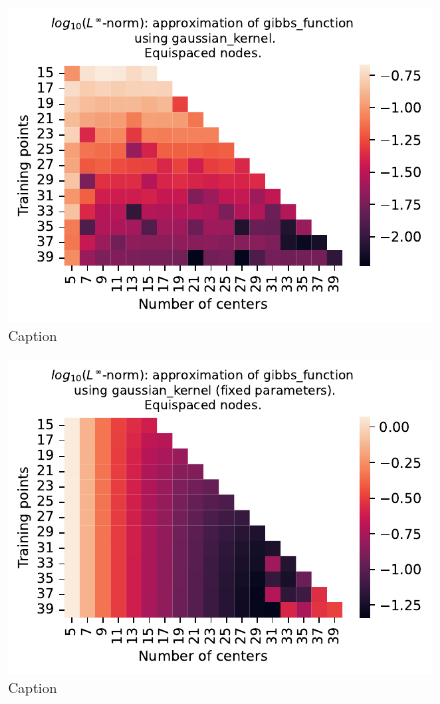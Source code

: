 \documentclass[12pt]{report} %
\begin{document}
\begin{figure}[ht]
    \centering
    
    \includegraphics[width=.6\textwidth]{imagenes/experiments/1d/variational/gibbs_gaussian_extended.pdf}
    \caption{Caption}
    \label{fig:gibbs-gaussian-extended}
\end{figure}

\begin{figure}[ht]
    \centering
    
    \includegraphics[width=.6\textwidth]{imagenes/experiments/1d/least_squares/gibbs_exact_solution_fucks_up.pdf}
    \caption{Caption}
    \label{fig:gibbs-gaussian-extended-lstsq}
\end{figure}
\end{document}
